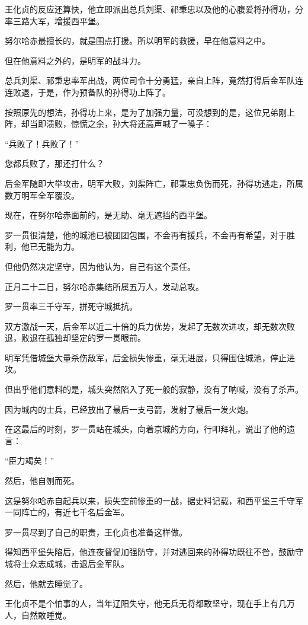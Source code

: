 \begin{multicols}{\theparacolNo}
王化贞的反应还算快，他立即派出总兵刘渠、祁秉忠以及他的心腹爱将孙得功，分率三路大军，增援西平堡。

努尔哈赤最擅长的，就是围点打援。所以明军的救援，早在他意料之中。

但在他意料之外的，是明军的战斗力。

总兵刘渠、祁秉忠率军出战，两位司令十分勇猛，亲自上阵，竟然打得后金军队连连败退，于是，作为预备队的孙得功上阵了。

按照原先的想法，孙得功上来，是为了加强力量，可没想到的是，这位兄弟刚上阵，却当即溃败，惊慌之余，孙大将还高声喊了一嗓子：

“兵败了！兵败了！”

您都兵败了，那还打什么？

后金军随即大举攻击，明军大败，刘渠阵亡，祁秉忠负伤而死，孙得功逃走，所属数万明军全军覆没。

现在，在努尔哈赤面前的，是无助、毫无遮挡的西平堡。

罗一贯很清楚，他的城池已被团团包围，不会再有援兵，不会再有希望，对于胜利，他已无能为力。

但他仍然决定坚守，因为他认为，自己有这个责任。

正月二十二日，努尔哈赤集结所属五万人，发动总攻。

罗一贯率三千守军，拼死守城抵抗。

双方激战一天，后金军以近二十倍的兵力优势，发起了无数次进攻，却无数次败退，败退在孤独却坚定的罗一贯眼前。

明军凭借城堡大量杀伤敌军，后金损失惨重，毫无进展，只得围住城池，停止进攻。

但出乎他们意料的是，城头突然陷入了死一般的寂静，没有了呐喊，没有了杀声。

因为城内的士兵，已经放出了最后一支弓箭，发射了最后一发火炮。

在这最后的时刻，罗一贯站在城头，向着京城的方向，行叩拜礼，说出了他的遗言：

“臣力竭矣！”

然后，他自刎而死。

这是努尔哈赤自起兵以来，损失空前惨重的一战，据史料记载，和西平堡三千守军一同阵亡的，有近七千名后金军。

罗一贯尽到了自己的职责，王化贞也准备这样做。

得知西平堡失陷后，他连夜督促加强防守，并对逃回来的孙得功既往不咎，鼓励守城将士众志成城，击退后金军队。

然后，他就去睡觉了。

王化贞不是个怕事的人，当年辽阳失守，他无兵无将都敢坚守，现在手上有几万人，自然敢睡觉。


\end{multicols}
